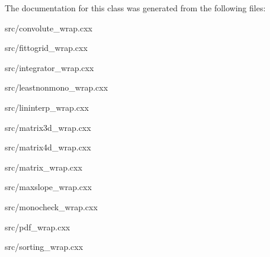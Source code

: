 The documentation for this class was generated from the following files:\begin{DoxyCompactItemize}
\item 
src/convolute\_\-wrap.cxx\item 
src/fittogrid\_\-wrap.cxx\item 
src/integrator\_\-wrap.cxx\item 
src/leastnonmono\_\-wrap.cxx\item 
src/lininterp\_\-wrap.cxx\item 
src/matrix3d\_\-wrap.cxx\item 
src/matrix4d\_\-wrap.cxx\item 
src/matrix\_\-wrap.cxx\item 
src/maxslope\_\-wrap.cxx\item 
src/monocheck\_\-wrap.cxx\item 
src/pdf\_\-wrap.cxx\item 
src/sorting\_\-wrap.cxx\end{DoxyCompactItemize}
